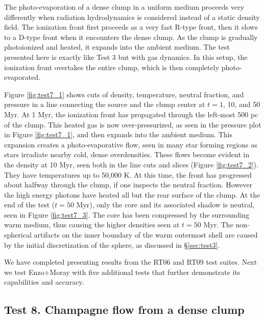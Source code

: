 \documentclass[useAMS,usenatbib,a4paper]{mn2e}
\begin{document}
\begin{figure*}
  \caption{\label{fig:test7_3} Test 7. (Photo-evaporation of a dense
    clump).  Same as Figure \ref{fig:test7_1} but at $t = 50$ Myr.}
\end{figure*}

The photo-evaporation of a dense clump in a uniform medium proceeds
very differently when radiation hydrodynamics is considered instead of
a static density field.  The ionization front first proceeds as a very
fast R-type front, then it slows to a D-type front when it encounters
the dense clump.  As the clump is gradually photoionized and heated,
it expands into the ambient medium.  The test presented here is
exactly like Test 3 but with gas dynamics.  In this setup, the
ionization front overtakes the entire clump, which is then completely
photo-evaporated.

Figure \ref{fig:test7_1} shows cuts of density, temperature, neutral
fraction, and pressure in a line connecting the source and the clump
center at $t = 1$, 10, and 50 Myr.  At 1 Myr, the ionization front has
propagated through the left-most 500 pc of the clump.  This heated gas
is now over-pressurized, as seen in the pressure plot in Figure
\ref{fig:test7_1}, and then expands into the ambient medium.  This
expansion creates a photo-evaporative flow, seen in many star forming
regions \citep[e.g. M16;][]{Hester96} as stars irradiate nearby cold,
dense overdensities.  These flows become evident in the density at 10
Myr, seen both in the line cuts and slices (Figure \ref{fig:test7_2}).
They have temperatures up to 50,000 K.  At this time, the front has
progressed about halfway through the clump, if one inspects the
neutral fraction.  However the high energy photons have heated all but
the rear surface of the clump.  At the end of the test ($t = 50$ Myr),
only the core and its associated shadow is neutral, seen in Figure
\ref{fig:test7_3}.  The core has been compressed by the surrounding
warm medium, thus causing the higher densities seen at $t = 50$ Myr.
The non-spherical artifacts on the inner boundary of the warm
outermost shell are caused by the initial discretization of the
sphere, as discussed in \S\ref{sec:test3}.

We have completed presenting results from the RT06 and RT09 test
suites.  Next we test Enzo+Moray with five additional tests that
further demonstrate its capabilities and accuracy.

\subsection{Test 8. Champagne flow from a dense clump}
\end{document}
